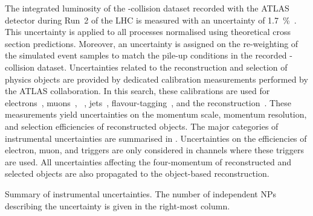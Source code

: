 The integrated luminosity of the \pp-collision dataset recorded with the ATLAS
detector during Run~2 of the LHC is measured with an uncertainty of
\SI{1.7}{\percent}~\cite{ATLAS-CONF-2019-021}. This uncertainty is applied to
all processes normalised using theoretical cross section predictions. Moreover,
an uncertainty is assigned on the re-weighting of the simulated event samples to
match the pile-up conditions in the recorded \pp-collision
dataset. Uncertainties related to the reconstruction and selection of physics
objects are provided by dedicated calibration measurements performed by the
ATLAS collaboration. In this search, these calibrations are used for
electrons~\cite{EGAM-2018-01,TRIG-2018-05}, muons~\cite{MUON-2018-03},
\tauhadvis~\cite{ATLAS-CONF-2017-029}, jets~\cite{JETM-2018-05},
flavour-tagging~\cite{FTAG-2018-01,FTAG-2020-08,FTAG-2021-002}, and the
\pTmissAbs reconstruction~\cite{ATLAS-CONF-2018-023}. These measurements yield
uncertainties on the momentum scale, momentum resolution, and selection
efficiencies of reconstructed objects. The major categories of instrumental
uncertainties are summarised in
. Uncertainties on the efficiencies of
electron, muon, and \tauhadvis triggers are only considered in channels where
these triggers are used. All uncertainties affecting the four-momentum of
reconstructed and selected objects are also propagated to the object-based
\pTmissAbs reconstruction.


\begin{table}[htbp]
  \centering

  \caption{Summary of instrumental uncertainties. The number of independent NPs
    describing the uncertainty is given in the right-most column.}%
  \label{tab:experimental_uncertainties_2}

  { \renewcommand{\arraystretch}{1.5}  }
\end{table}

